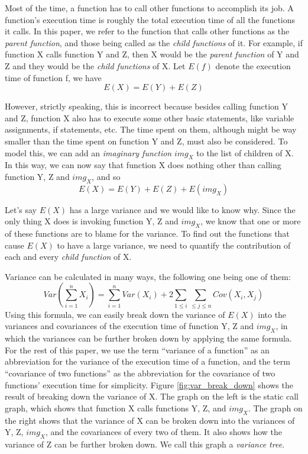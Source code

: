 Most of the time, a function has to call other functions to accomplish its
job. A function's execution time is roughly the total execution time of all
the functions it calls. In this paper, we refer to the function that calls
other functions as the \textit{parent function}, and those being called as the
\textit{child functions} of it. For example, if function X calls function Y and
Z, then X would be the \textit{parent function} of Y and Z and they would
be the \textit{child functions} of X. Let $E(f)$ denote the execution time of
function f, we have
\begin{displaymath}
E(X) = E(Y) + E(Z)
\end{displaymath}

However, strictly speaking, this is incorrect because besides calling function
Y and Z, function X also has to execute some other basic statements, like
variable assignments, if statements, etc. The time spent on them, although
might be way smaller than the time spent on function Y and Z, must also be
considered. To model this, we can add an \textit{imaginary function} $img_X$
to the list of children of X. In this way, we can now say that function X does
nothing other than calling function Y, Z and $img_X$, and so
\begin{displaymath}
E(X) = E(Y) + E(Z)+ E(img_X)
\end{displaymath}

Let's say $E(X)$ has a large variance and we would like to know why. Since the
only thing X does is invoking function Y, Z and $img_X$, we know that one or
more of these functions are to blame for the variance. To find out the 
functions that cause $E(X)$ to have a large variance, we need to quantify
the contribution of each and every \textit{child function} of X.

Variance can be calculated in many ways, the following one being one of them:
\begin{equation}
Var(\sum_{i=1}^{n}X_i) = \sum_{i=1}^{n}Var(X_i) + 2\sum_{1\leq i}\sum_{\leq j \leq n}Cov(X_i, X_j)
\label{eq:var-break-down}
\end{equation}
Using this formula, we can easily break down the variance of $E(X)$ into the
variances and covariances of the execution time of function Y, Z and $img_X$,
in which the variances can be further broken down by applying the same formula.
For the rest of this paper, we use the term ``variance of a function'' as an
abbreviation for the variance of the execution time of a function, and the term
``covariance of two functions'' as the abbreviation for the covariance of two
functions' execution time for simplicity. Figure \ref{fig:var_break_down} shows
the result of breaking down the variance of X. The graph on the left is the
static call graph, which shows that function X calls functions Y, Z, and $img_X$.
The graph on the right shows that the variance of X can be broken down into
the variances of Y, Z, $img_X$, and the covariances of every two of them. It
also shows how the variance of Z can be further broken down. We call this graph
a \textit{variance tree}.

